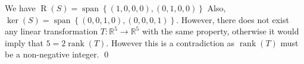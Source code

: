 \documentclass[12pt]{article}
\begin{document}
\begin{enumerate}[label=\textbf{(\alph*)}]
    We have $\operatorname{R}\left(S\right)=\operatorname{span}\left\{\left(1,0,0,0\right),\left(0,1,0,0\right)\right\}$ Also, $\operatorname{ker}\left(S\right)=\operatorname{span}\left\{\left(0,0,1,0\right),\left(0,0,0,1\right)\right\}$.
    \newline
    \newline However, there does not exist any linear transformation $T:\mathbb{R}^5\rightarrow\mathbb{R}^5$ with the same property, otherwise it would imply that $5=2\operatorname{rank}\left(T\right)$. However this is a contradiction as $\operatorname{rank}\left(T\right)$ must be a non-negative integer. \qed 
\end{enumerate}
\end{document}
